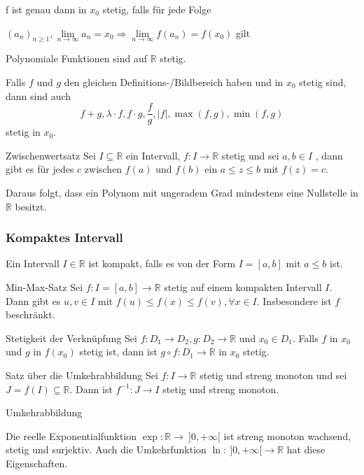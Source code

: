 \documentclass[a4paper,10pt]{article}
\def\limn{\lim\limits_{n\to \infty}}
\def\R{\mathbb{R}}
\begin{document}
f ist genau dann in $x_0$ stetig, falls für jede Folge \par
$(a_n)_{n\geq 1}, \limn a_n = x_0 \Rightarrow \limn f(a_n) = f(x_0)$ gilt

Polynomiale Funktionen sind auf $\R$ stetig.
\begin{subbox}{}
 Falls $f$ und $g$ den gleichen Definitions-/Bildbereich haben und in $x_0$ stetig sind, dann sind auch $$f + g, \lambda \cdot f, f \cdot g, \frac{f}{g}, |f|, \max(f,g), \min(f,g)$$ stetig in $x_0$.
\end{subbox}


\begin{mainbox}{Zwischenwertsatz}
 Sei $I \subseteq \R$ ein Intervall, $f: I \to \R$ stetig und sei $a, b \in I$ , dann gibt es für jedes $c$ zwischen $f(a)$ und $f(b)$ ein $a \le z \le b$ mit $f(z) = c$.
\end{mainbox}
Daraus folgt, dass ein Polynom mit ungeradem Grad mindestens eine Nullstelle in $\R$ besitzt.

\subsubsection{Kompaktes Intervall}
Ein Intervall $I \in \R$ ist kompakt, falls es von der Form $I = [a,b]$ mit $a \le b$ ist.

\begin{mainbox}{Min-Max-Satz}
 Sei $f: I = [a,b] \to \R$ stetig auf einem kompakten Intervall $I$. Dann gibt es $u, v \in I$ mit $f(u) \le f(x) \le f(v), \forall x \in I$. Insbesondere ist $f$ beschränkt.
\end{mainbox}

\begin{subbox}{Stetigkeit der Verknüpfung}
 Sei $f: D_1 \to D_2, g: D_2 \to \R$ und $x_0 \in D_1$. Falls $f$ in $x_0$ und $g$ in $f(x_0)$ stetig ist, dann ist $g \circ f: D_1 \to \R$ in $x_0$ stetig.
\end{subbox}

\begin{mainbox}{Satz über die Umkehrabbildung}
 Sei $f: I \to \R$ stetig und streng monoton und sei $J = f(I) \subseteq \R$. Dann ist $f^{-1}: J \to I$ stetig und streng monoton.
\end{mainbox}

\begin{subbox}{Umkehrabbildung}
\end{subbox}

\begin{subbox}{Die reelle Exponentialfunktion}
 $\exp: \R \to \ ]0,+\infty[$ ist streng monoton wachsend, stetig und surjektiv. Auch die Umkehrfunktion $\ln: \ ]0,+\infty[ \to \R$ hat diese Eigenschaften.
\end{subbox}
\end{document}
